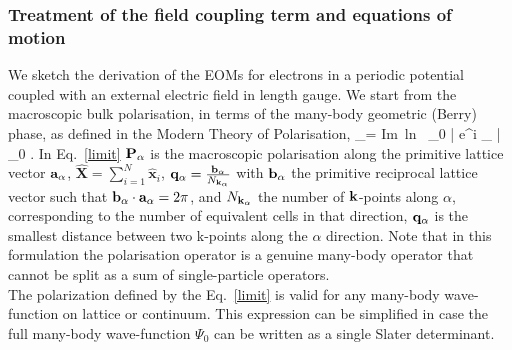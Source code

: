 \subsubsection{Treatment of the field coupling term and equations of motion}\label{ss:fldcpl}
We sketch the derivation of the EOMs for electrons in a periodic potential coupled with an external electric field in length gauge. We start from the macroscopic bulk polarisation, in terms of the many-body geometric (Berry) phase, as defined in the Modern Theory of Polarisation\cite{RevModPhys.66.899},
%
%
\be 
\PP_\alpha =   \mbox{Im ln }  \langle \Psi_0 | {\rm e}^{i \qq_\alpha \cdot {}} | \Psi_0 \rangle . \label{limit} 
\ee
In Eq.~\eqref{limit} ${\bf P}_\alpha$ is the macroscopic polarisation along the primitive lattice vector ${\bf a}_\alpha$, $\hat{\mathbf X} = \sum_{i=1}^{N} \hat{\mathbf x}_i$, ${\bf q}_\alpha = \frac{{\bf b}_\alpha}{N_{{\bf k}_\alpha}}$ with ${\bf b}_\alpha$ the primitive reciprocal lattice vector such that ${\bf b}_\alpha\cdot{\bf a}_\alpha=2\pi$, and $N_{{\bf k}_\alpha}$ the number of ${\bf k}$-points along $\alpha$, corresponding to the number of equivalent cells in that direction, ${\bf q}_\alpha$ is the smallest distance between two k-points along the $\alpha$ direction.
Note that in this formulation the polarisation operator is a genuine many-body operator that cannot be split as a sum of single-particle operators. \\
The polarization defined by the Eq.~\ref{limit} is valid for any many-body wave-function on lattice or continuum\cite{PhysRevLett.80.1800,resta1999electron}. This expression can be simplified in case the full many-body wave-function  $\Psi_0$ can be written as a single Slater determinant.
